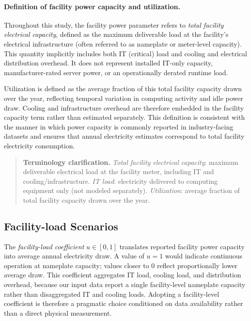 \documentclass[12pt]{article}
\begin{document}
\paragraph{Definition of facility power capacity and utilization.}
Throughout this study, the facility power parameter refers to \emph{total facility electrical capacity}, defined as the maximum deliverable load at the facility’s electrical infrastructure (often referred to as nameplate or meter-level capacity). This quantity implicitly includes both IT (critical) load and cooling and electrical distribution overhead. It does not represent installed IT-only capacity, manufacturer-rated server power, or an operationally derated runtime load.

Utilization is defined as the average fraction of this total facility capacity drawn over the year, reflecting temporal variation in computing activity and idle power draw. Cooling and infrastructure overhead are therefore embedded in the facility capacity term rather than estimated separately. This definition is consistent with the manner in which power capacity is commonly reported in industry-facing datasets and ensures that annual electricity estimates correspond to total facility electricity consumption.
\begin{quote}
\textbf{Terminology clarification.}  
\emph{Total facility electrical capacity}: maximum deliverable electrical load at the facility meter, including IT and cooling/infrastructure.  
\emph{IT load}: electricity delivered to computing equipment only (not modeled separately).  
\emph{Utilization}: average fraction of total facility capacity drawn over the year.
\end{quote}


\subsection{Facility-load Scenarios}
\label{sm:s3_utilization}

The \textit{facility-load coefficient} $u \in [0, 1]$ translates reported
facility power capacity into average annual electricity draw. A value of $u=1$
would indicate continuous operation at nameplate capacity; values closer to $0$
reflect proportionally lower average draw. This coefficient aggregates IT
load, cooling load, and distribution overhead, because our input data report a
single facility-level nameplate capacity rather than disaggregated IT and
cooling loads. Adopting a facility-level coefficient is therefore a pragmatic
choice conditioned on data availability rather than a direct physical
measurement.
\end{document}
